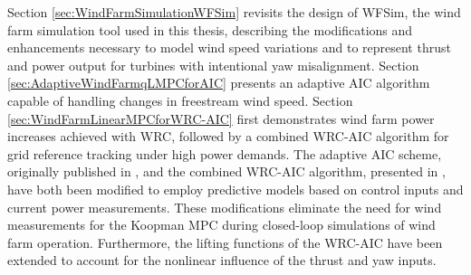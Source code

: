Section \ref{sec:WindFarmSimulationWFSim} revisits the design of WFSim, the wind farm simulation tool used in this thesis, describing the modifications and enhancements necessary to model wind speed variations and to represent thrust and power output for turbines with intentional yaw misalignment. Section \ref{sec:AdaptiveWindFarmqLMPCforAIC} presents an adaptive AIC algorithm capable of handling changes in freestream wind speed. Section \ref{sec:WindFarmLinearMPCforWRC-AIC} first demonstrates wind farm power increases achieved with WRC, followed by a combined WRC-AIC algorithm for grid reference tracking under high power demands. The adaptive AIC scheme, originally published in \cite{dittmer2022data}, and the combined WRC-AIC algorithm, presented in \cite{dittmer2023koopman}, have both been modified to employ predictive models based on control inputs and current power measurements. These modifications eliminate the need for wind measurements for the Koopman MPC during closed-loop simulations of wind farm operation. Furthermore, the lifting functions of the WRC-AIC have been extended to account for the nonlinear influence of the thrust and yaw inputs.

